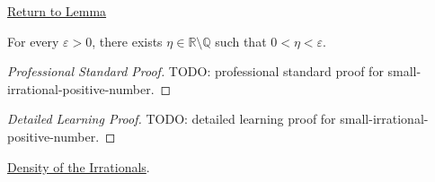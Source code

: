 \newpage
{}
\label{prf:small-irrational-positive-number}

\begin{remark*}[Return]
\hyperref[lem:small-irrational-positive-number]{Return to Lemma}
\end{remark*}

\begin{lemma*}
For every $\varepsilon>0$, there exists
$\eta\in\mathbb{R}\setminus\mathbb{Q}$ such that $0<\eta<\varepsilon$.
\end{lemma*}

\begin{proof}[Professional Standard Proof]
\LRAProofBodyStart
TODO: professional standard proof for small-irrational-positive-number.
\end{proof}

\begin{proof}[Detailed Learning Proof]
\LRAProofBodyStart
TODO: detailed learning proof for small-irrational-positive-number.
\end{proof}

\begin{remark*}
\end{remark*}

\begin{dependencies}
\hyperref[thm:density-of-irrationals-in-reals]{Density of the Irrationals}.
\end{dependencies}

\clearpage
